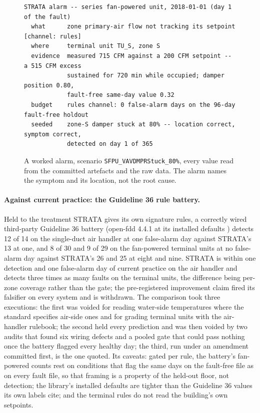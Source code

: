\documentclass[11pt,letterpaper]{article}
\begin{document}
\begin{figure}[htbp]
\small
\begin{verbatim}
STRATA alarm -- series fan-powered unit, 2018-01-01 (day 1 of the fault)
  what      zone primary-air flow not tracking its setpoint   [channel: rules]
  where     terminal unit TU_S, zone S
  evidence  measured 715 CFM against a 200 CFM setpoint -- a 515 CFM excess
            sustained for 720 min while occupied; damper position 0.80,
            fault-free same-day value 0.32
  budget    rules channel: 0 false-alarm days on the 96-day fault-free holdout
  seeded    zone-S damper stuck at 80% -- location correct, symptom correct,
            detected on day 1 of 365
\end{verbatim}
\caption{A worked alarm, scenario \texttt{SFPU\_VAVDMPRStuck\_80\%}, every value read from the committed artefacts and the raw data. The alarm names the symptom and its location, not the root cause.}
\label{lst:alarm}
\end{figure}

\paragraph{Against current practice: the Guideline 36 rule battery.}
\label{sec:baseline}
Held to the treatment STRATA gives its own signature rules, a correctly wired third-party Guideline 36 battery (open-fdd 4.4.1 at its installed defaults \cite{openfdd2025,ashrae2021guideline36}) detects 12 of 14 on the single-duct air handler at one false-alarm day against STRATA's 13 at one, and 8 of 30 and 9 of 29 on the fan-powered terminal units at no false-alarm day against STRATA's 26 and 25 at eight and nine. STRATA is within one detection and one false-alarm day of current practice on the air handler and detects three times as many faults on the terminal units, the difference being per-zone coverage rather than the gate; the pre-registered improvement claim fired its falsifier on every system and is withdrawn. The comparison took three executions: the first was voided for reading water-side temperatures where the standard specifies air-side ones and for grading terminal units with the air-handler rulebook; the second held every prediction and was then voided by two audits that found six wiring defects and a pooled gate that could pass nothing once the battery flagged every healthy day; the third, run under an amendment committed first, is the one quoted. Its caveats: gated per rule, the battery's fan-powered counts rest on conditions that flag the same days on the fault-free file as on every fault file, so that framing is a property of the held-out floor, not detection; the library's installed defaults are tighter than the Guideline 36 values its own labels cite; and the terminal rules do not read the building's own setpoints.
\end{document}
